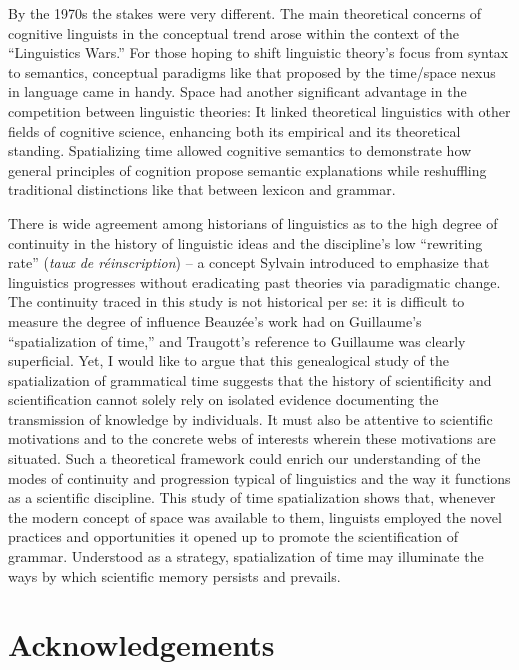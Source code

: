 \documentclass[output=paper]{langsci/langscibook}
\begin{document}
By the 1970s the stakes were very different. The main theoretical concerns of cognitive linguists in the conceptual trend arose within the context of the “Linguistics Wars.” For those hoping to shift linguistic theory’s focus from syntax to semantics, conceptual paradigms like that proposed by the time/space nexus in language came in handy. Space had another significant advantage in the competition between linguistic theories: It linked theoretical linguistics with other fields of cognitive science, enhancing both its empirical and its theoretical standing. Spatializing time allowed cognitive semantics to demonstrate how general principles of cognition propose semantic explanations while reshuffling traditional distinctions like that between lexicon and grammar. 

There is wide agreement among historians of linguistics as to the high degree of continuity in the history of linguistic ideas and the discipline’s low “rewriting rate” (\textit{taux de réinscription}) -- a concept Sylvain \citet{auroux_histoire_1980} introduced to emphasize that linguistics progresses without eradicating past theories via paradigmatic change. The continuity traced in this study is not historical per se: it is difficult to measure the degree of influence Beauzée’s work had on Guillaume’s “spatialization of time,” and Traugott’s reference to Guillaume was clearly superficial. Yet, I would like to argue that this genealogical study of the spatialization of grammatical time suggests that the history of scientificity \citep{auroux_techne_1990} and scientification cannot solely rely on isolated evidence documenting the transmission of knowledge by individuals. It must also be attentive to scientific motivations and to the concrete webs of interests wherein these motivations are situated. Such a theoretical framework could enrich our understanding of the modes of continuity and progression typical of linguistics and the way it functions as a scientific discipline. This study of time spatialization shows that, whenever the modern concept of space was available to them, linguists employed the novel practices and opportunities it opened up to promote the scientification of grammar. Understood as a strategy, spatialization of time may illuminate the ways by which scientific memory persists and prevails.

\section*{Acknowledgements}

{\sloppy\printbibliography[heading=subbibliography,notkeyword=this]}
\end{document}
